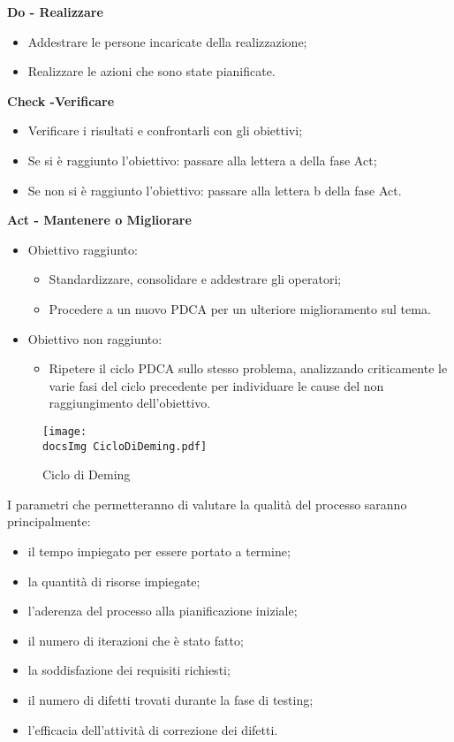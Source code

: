{{\begin{itemize}
{		\item[2.] \textbf{Do - Realizzare} 
			\begin{itemize}
				\item[(a)] Addestrare le persone incaricate della realizzazione;
				\item[(b)] Realizzare le azioni che sono state pianificate.
			\end{itemize}
		\item[3.] \textbf{Check -Verificare} 
			\begin{itemize}
			    \item[(a)] Verificare i risultati e confrontarli con gli obiettivi;
				\item[•] Se si è raggiunto l’obiettivo: passare alla lettera a della fase Act;
				\item[•] Se non si è raggiunto l’obiettivo: passare alla lettera b della fase Act.
			\end{itemize}
		\item[4.] \textbf{Act - Mantenere o Migliorare}
			\begin{itemize}
				\item[(a)] Obiettivo raggiunto:
				\begin{itemize}
					\item[i.] Standardizzare, consolidare e addestrare gli operatori;
					\item[ii.] Procedere a un nuovo PDCA per un ulteriore miglioramento sul tema.
					\end{itemize}
			\item[(b)] Obiettivo non raggiunto:
				\begin{itemize}
				\item[i.] Ripetere il ciclo PDCA sullo stesso problema, analizzando criticamente le varie fasi del ciclo precedente per individuare le cause del non raggiungimento dell’obiettivo.
				\end{itemize}
			\end{itemize}
	}\end{itemize}
	
	 
	\begin{figure}[h!]
	  \centering
	  \texttt{[image: \\docsImg CicloDiDeming.pdf]}
	  \caption{Ciclo di Deming}
	\end{figure}
	
	I parametri che permetteranno di valutare la qualità del processo saranno principalmente:
	\begin{itemize}
		\item il tempo impiegato per essere portato a termine;
		\item la quantità di risorse impiegate;
		\item l’aderenza del processo alla pianificazione iniziale;
		\item il numero di iterazioni che è stato fatto;
		\item la soddisfazione dei requisiti richiesti;
		\item il numero di difetti trovati durante la fase di testing;
		\item l'efficacia dell'attività di correzione dei difetti.
	\end{itemize}
	
}}

